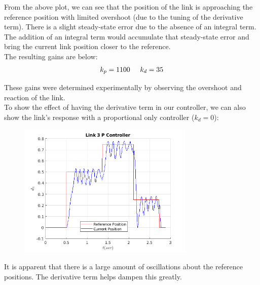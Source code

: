\documentclass[10pt]{article}
\begin{document}
\begin{enumerate}
	From the above plot, we can see that the position of the link is approaching the reference position with limited overshoot (due to the tuning of the derivative term). There is a slight steady-state error due to the absence of an integral term. The addition of an integral term would accumulate that steady-state error and bring the current link position closer to the reference. 
	\\
	
	The resulting gains are below:
	\begin{align*}
		k_p = 1100 \hspace{0.5cm} k_d = 35
	\end{align*}
	
	These gains were determined experimentally by observing the overshoot and reaction of the link.
	\\
	
	To show the effect of having the derivative term in our controller, we can also show the link's response with a proportional only controller ($k_d = 0$):
	
	\begin{figure}[H]
		\centering
		\includegraphics[width=0.75\textwidth]{figures/link_3_p_plot1.png}
	\end{figure}

	It is apparent that there is a large amount of oscillations about the reference positions. The derivative term helps dampen this greatly.

\end{enumerate}
\end{document}
